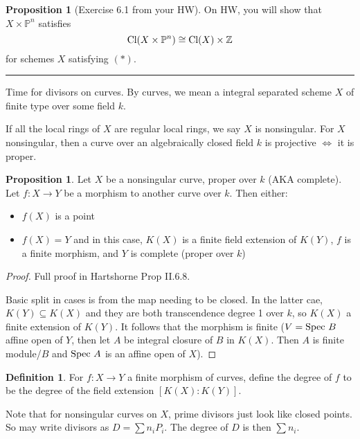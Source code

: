\documentclass[10pt,reqno]{amsart}
\theoremstyle{definition}
\newtheorem{definition}[theorem]{Definition}
\newtheorem{proposition}[theorem]{Proposition}
\theoremstyle{remark}
\numberwithin{equation}{section}
\numberwithin{theorem}{section}
\newcommand*{\red}{\textcolor{red}}
\newcommand{\Z}{{\mathbb Z}}
\newcommand{\spec}{\textup{Spec }}
\newcommand{\cl}{\textup{Cl}}
\newcommand{\PP}{{\mathbb P}}
\begin{document}
\begin{proposition}[Exercise 6.1 from your HW] On HW, you will show that $X \times \PP^n$ satisfies
\[\cl(X \times \PP^n) \cong \cl(X) \times \Z\]
for schemes $X$ satisfying $(\ast)$.
\end{proposition}

\hrule
\vspace{1em}

Time for divisors on curves. By curves, we mean a integral separated scheme $X$ of finite type over some field $k$.

If all the local rings of $X$ are regular local rings, we say $X$ is nonsingular. For $X$ nonsingular, then a curve over an algebraically closed field $k$ is projective $\iff$ it is proper.


\begin{proposition} Let $X$ be a nonsingular curve, proper over $k$ (AKA complete). Let $f:X \to Y$ be a morphism to another curve over $k$. Then either:
\begin{itemize}
\item $f(X)$ is a point
\item $f(X) = Y$ and in this case, $K(X)$ is a finite field extension of $K(Y)$, $f$ is a finite morphism, and $Y$ is complete (proper over $k$)
\end{itemize}
\end{proposition}
\begin{proof} Full proof in Hartshorne Prop II.6.8. 

Basic split in cases is from the map needing to be closed. In the latter cae, $K(Y) \subseteq K(X)$ and they are both transcendence degree 1 over $k$, so $K(X)$ a finite extension of $K(Y)$. It follows that the morphism is finite ($V = \spec B$ affine open of $Y$, then let $A$ be integral closure of $B$ in $K(X)$. Then $A$ is finite module/$B$ and $\spec A$ is an affine open of $X$).
\end{proof}

\begin{definition} For $f: X \to Y$ a finite morphism of curves, define the degree of $f$ to be the degree of the field extension $[K(X):K(Y)]$.
\end{definition}

Note that for nonsingular curves on $X$, prime divisors just look like closed points. So may write divisors as $D = \sum n_i P_i$. The degree of $D$ is then $\sum n_i$.
\end{document}
